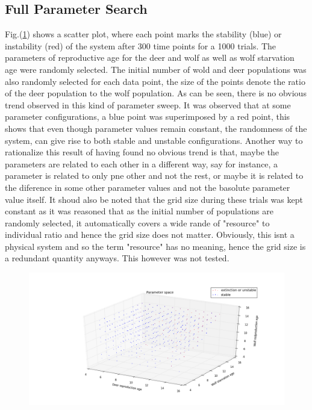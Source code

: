\documentclass[a4paper,12pt]{article}
\begin{document}
\subsection{Full Parameter Search}
\indent Fig.(\ref{full_para}) shows a scatter plot, where each point marks the stability (blue) or instability (red) of the system after 300 time points for a 1000 trials. The parameters of reproductive age for the deer and wolf as well as wolf starvation age were randomly selected.
The initial number of wold and deer populations was also randomly selected for each data point, the size of the points denote the ratio of the deer population to the wolf population.
As can be seen, there is no obvious trend observed in this kind of parameter sweep. It was observed that at some parameter configurations, a blue point was superimposed by a red point, this shows that even though parameter values remain constant, the randomness of the system, can give rise to both stable and unstable configurations.
Another way to rationalize this result of having found no obvious trend is that, maybe the parameters are related to each other in a different way, say for instance, a parameter is related to only pne other and not the rest, or maybe it is related to the diference in some other parameter values and not the basolute parameter value itself. 
It shoud also be noted that the grid size during these trials was kept constant as it was reasoned that as the initial number of populations are randomly selected, it automatically covers a wide rande of "resource" to individual ratio and hence the grid size does not matter. Obviously, this isnt a physical system and so the term "resource" has no meaning, hence the grid size is a redundant quantity anyways. 
This however was not tested.
\begin{figure}
	\includegraphics[width = 1\textwidth]{./pics/Eco_All_param_front.png}
	\label{full_para}
\end{figure}
\end{document}

